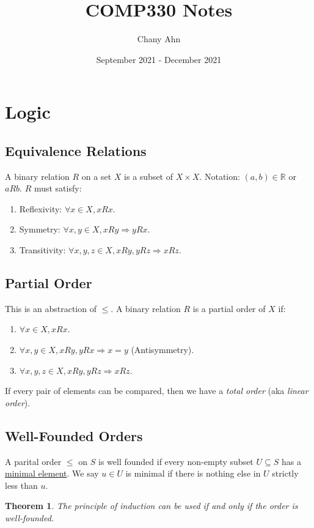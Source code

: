 \documentclass{article}
\title{COMP330 Notes}
\author{Chany Ahn}
\date{September 2021 - December 2021}
\newtheorem{theorem}{Theorem}
\begin{document}
\maketitle
\newpage
\tableofcontents
\newpage
\section{Logic}
\subsection{Equivalence Relations}
A binary relation $R$ on a set $X$ is a subset of $X \times X$. Notation: $(a,b) \in \mathbb{R}$ or $aRb$. $R$ must satisfy:
\begin{enumerate}
    \item Reflexivity: $\forall x \in X, xRx$.
    \item Symmetry: $\forall x,y \in X, xRy \Rightarrow yRx$.
    \item Transitivity: $\forall x,y,z \in X, xRy, yRz \Rightarrow xRz$.
\end{enumerate}

\subsection{Partial Order}
This is an abstraction of $\leq$. A binary relation $R$ is a partial order of $X$ if:
\begin{enumerate}
    \item $\forall x \in X, xRx$.
    \item $\forall x,y \in X, xRy, yRx \Rightarrow x = y$ (Antisymmetry).
    \item $\forall x,y,z \in X, xRy, yRz \Rightarrow xRz$.
\end{enumerate}
If every pair of elements can be compared, then we have a \textit{total order} (aka \textit{linear order}).
\subsection{Well-Founded Orders}
A parital order $\leq$ on $S$ is well founded if every non-empty subset $U \subseteq S$ has a \underline{minimal element}. We say $u \in U$ is minimal if there is nothing else in $U$ strictly less than $u$.

\begin{theorem}
The principle of induction can be used if and only if the order is well-founded.
\end{theorem}
\end{document}
